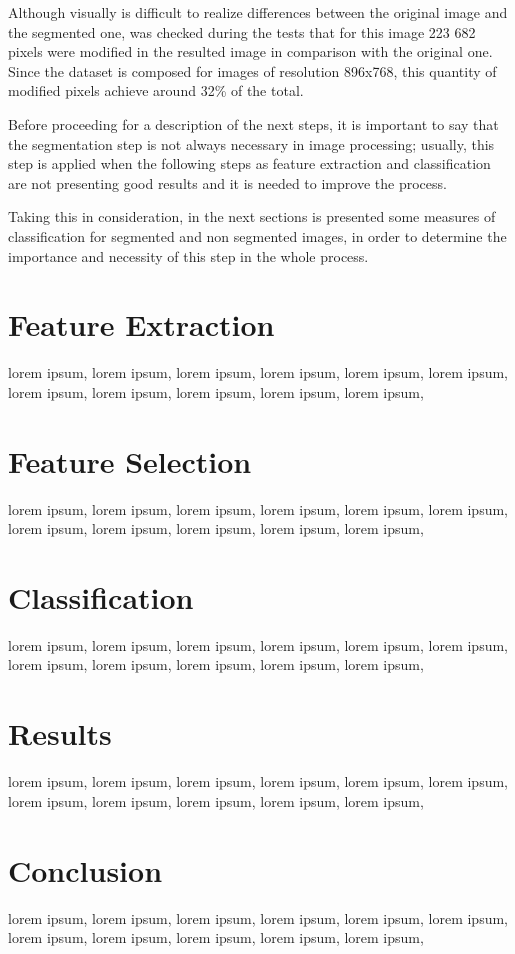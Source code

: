 \documentclass[conference]{IEEEtran}
\begin{document}
Although visually is difficult to realize differences between the original image and the segmented one, was checked during the tests that for this image 223 682 pixels were modified in the resulted image in comparison with the original one. Since the dataset is composed for images of resolution 896x768, this quantity of modified pixels achieve around 32\% of the total.\par
Before proceeding for a description of the next steps, it is important to say that the segmentation step is not always necessary in image processing; usually, this step is applied when the following steps as feature extraction and classification are not presenting good results and it is needed to improve the process.\par
Taking this in consideration, in the next sections is presented some measures of classification for segmented and non segmented images, in order to determine the importance and necessity of this step in the whole process.

\section{Feature Extraction}
lorem ipsum, lorem ipsum, lorem ipsum, lorem ipsum, lorem ipsum, lorem ipsum, lorem ipsum, lorem ipsum, lorem ipsum, lorem ipsum, lorem ipsum, 

\section{Feature Selection}
lorem ipsum, lorem ipsum, lorem ipsum, lorem ipsum, lorem ipsum, lorem ipsum, lorem ipsum, lorem ipsum, lorem ipsum, lorem ipsum, lorem ipsum, 

\section{Classification}
lorem ipsum, lorem ipsum, lorem ipsum, lorem ipsum, lorem ipsum, lorem ipsum, lorem ipsum, lorem ipsum, lorem ipsum, lorem ipsum, lorem ipsum, 


\section{Results}
lorem ipsum, lorem ipsum, lorem ipsum, lorem ipsum, lorem ipsum, lorem ipsum, lorem ipsum, lorem ipsum, lorem ipsum, lorem ipsum, lorem ipsum, 

\section{Conclusion}
lorem ipsum, lorem ipsum, lorem ipsum, lorem ipsum, lorem ipsum, lorem ipsum, lorem ipsum, lorem ipsum, lorem ipsum, lorem ipsum, lorem ipsum, 



\end{document}
